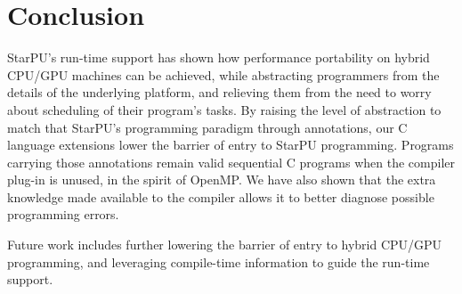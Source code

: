 \documentclass[twoside, a4paper, 10pt]{article}
\begin{document}
\section{Conclusion}
\label{sec-6}


StarPU's run-time support has shown how performance portability on
hybrid CPU/GPU machines can be achieved, while abstracting programmers
from the details of the underlying platform, and relieving them from the
need to worry about scheduling of their program's tasks.  By raising the
level of abstraction to match that StarPU's programming paradigm through
annotations, our C language extensions lower the barrier of entry to
StarPU programming.  Programs carrying those annotations remain valid
sequential C programs when the compiler plug-in is unused, in the spirit
of OpenMP.  We have also shown that the extra knowledge made available
to the compiler allows it to better diagnose possible programming
errors.

Future work includes further lowering the barrier of entry to hybrid
CPU/GPU programming, and leveraging compile-time information to guide
the run-time support.





\end{document}
